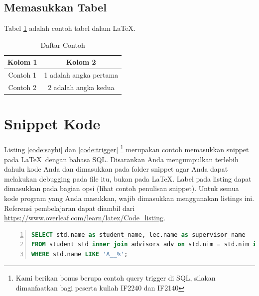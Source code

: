 \subsection{Memasukkan Tabel}\label{subsec: table}
Tabel \ref{tab:tabel-contoh} adalah contoh tabel dalam \LaTeX.
\begin{table}
    \centering
    \begin{tabular}{cc}
        \hline
        Kolom 1 & Kolom 2\\
        \hline
        Contoh 1 & 1 adalah angka pertama \\
        Contoh 2 & 2 adalah angka kedua \\
        \hline
    \end{tabular}
    \caption{Daftar Contoh}
    \label{tab:tabel-contoh}
\end{table}

\section{Snippet Kode}
Listing \ref{code:sayhi} dan \ref{code:trigger} \footnote{Kami berikan bonus berupa contoh query trigger di SQL, silakan dimanfaatkan bagi peserta kuliah IF2240 dan IF2140} merupakan contoh memasukkan snippet pada \LaTeX \ dengan bahasa SQL. Disarankan Anda mengumpulkan terlebih dahulu kode Anda dan dimasukkan pada folder snippet agar Anda dapat melakukan debugging pada file itu, bukan pada \LaTeX. Label pada listing dapat dimasukkan pada bagian opsi (lihat contoh penulisan snippet). Untuk semua kode program yang Anda masukkan, wajib dimasukkan menggunakan listings ini. Referensi pembelajaran dapat diambil dari \url{https://www.overleaf.com/learn/latex/Code_listing}.

\begin{lstlisting}[language=SQL, basicstyle=\ttfamily\small, frame=single, numbers=left, caption={SayHi}, showstringspaces=false, breaklines=True, label={code:sayhi}]
SELECT std.name as student_name, lec.name as supervisor_name
FROM student std inner join advisors adv on std.nim = std.nim inner join lectures lec on adv.nip = lec.nip
WHERE std.name LIKE 'A__%';
\end{lstlisting} %

